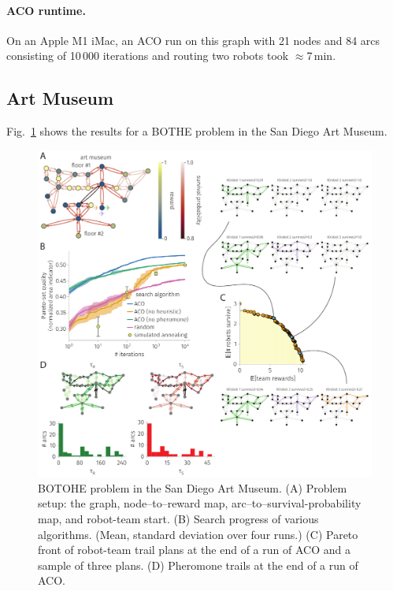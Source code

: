 \documentclass[fleqn,10pt,lineno]{wlpeerj}
\begin{document}
\paragraph{ACO runtime.} On an Apple M1 iMac, an ACO run on this graph with 21 nodes and 84 arcs consisting of 10\,000 iterations and routing two robots took $\approx$7\,min.



\subsection{Art Museum}
Fig.~\ref{fig:art_museum} shows the results for a BOTHE problem in the San Diego Art Museum.

\begin{figure}[h!]
    \centering
    	\includegraphics[width=\textwidth]{art_museum_results.pdf}
    \caption{
    BOTOHE problem in the San Diego Art Museum. 
    (A) Problem setup: the graph, node--to--reward map, arc--to--survival-probability map, and robot-team start.
    (B) Search progress of various algorithms. (Mean, standard deviation over four runs.)
    (C) Pareto front of robot-team trail plans at the end of a run of ACO and a sample of three plans.
    (D) Pheromone trails at the end of a run of ACO.
    } \label{fig:art_museum}
\end{figure}
\end{document}
